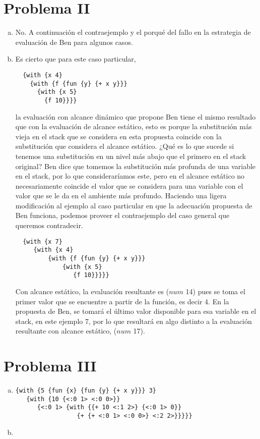 \documentclass[12pt]{article}
\begin{document}
\section{Problema II}
\begin{enumerate}[a)]
\item No. A continuación el contraejemplo y el porqué del fallo en la estrategia de evaluación de Ben para algunos casos.
\item Es cierto que para este caso particular,
\begin{verbatim}
  {with {x 4}
    {with {f {fun {y} {+ x y}}}
      {with {x 5}
        {f 10}}}}
\end{verbatim}
  la evaluación con alcance dinámico que propone Ben tiene el mismo resultado que con la evaluación
  de alcance estático, esto es porque la substitución más vieja en el stack que se considera en esta propuesta coincide con la substitución que
  considera el alcance estático. ¿Qué es lo que sucede si tenemos una substitución en un nivel más abajo que el primero en el stack original?
  Ben dice que tomemos la substitución más profunda de una variable en el stack, por lo que consideraríamos este, pero en el alcance estático
  no necesariamente coincide el valor que se considera para una variable con el valor que se le da en el ambiente más profundo.
  Haciendo una ligera modificación al ejemplo al caso particular en que la adecuación propuesta de Ben funciona, podemos proveer el contraejemplo
  del caso general que queremos contradecir.
\begin{verbatim}
  {with {x 7}
     {with {x 4}
         {with {f {fun {y} {+ x y}}} 
             {with {x 5} 
                {f 10}}}}}
\end{verbatim}
Con alcance estático, la evaluación resultante es ($num$ 14) pues se toma el primer valor que se encuentre a partir de la función, es decir 4.
En la propuesta de Ben, se tomará el último valor disponible para esa variable en el stack, en este ejemplo 7, por lo que resultará en
algo distinto a la evaluación resultante con alcance estático, ($num$ 17).
\end{enumerate}

\section{Problema III}
\begin{enumerate}[a)]
\item
\begin{verbatim}
{with {5 {fun {x} {fun {y} {+ x y}}} 3} 
   {with {10 {<:0 1> <:0 0>}} 
      {<:0 1> {with {{+ 10 <:1 2>} {<:0 1> 0}} 
                 {+ {+ <:0 1> <:0 0>} <:2 2>}}}}}
\end{verbatim}
\item 
\end{enumerate}
\end{document}
